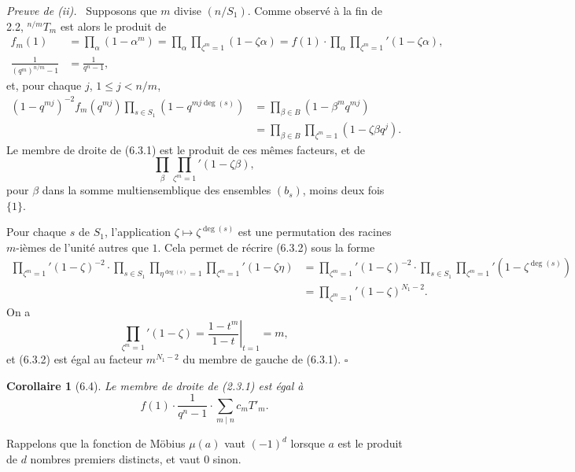 \documentclass[10pt]{article}
\newcommand{\degm}{\operatorname{deg}}
\theoremstyle{deligne}
\newtheorem*{corollary*}{Corollaire}
\newenvironment{proofdel}[1][Preuve.]{\textit{#1}\ }{\hfill$\square$}
\begin{document}
\begin{proofdel}[Preuve de (ii).]
Supposons que $m$ divise $(n/S_1)$. Comme observé à la fin de 2.2, ${}^{n/m}T_m$ est alors le produit de
\begin{align*}
f_m(1)&=\prod_\alpha(1-\alpha^m)=\prod_\alpha\prod_{\zeta^m=1}(1-\zeta\alpha)
      =f(1)\cdot\prod_\alpha\prod_{\zeta^m=1}'(1-\zeta\alpha),\\
\frac{1}{(q^m)^{n/m}-1}&=\frac{1}{q^n-1},
\end{align*}
et, pour chaque $j$, $1\le j<n/m$,
\begin{align*}
(1-q^{mj})^{-2}f_m(q^{mj})\prod_{s\in S_1}(1-q^{mj\degm(s)})
&=\prod_{\beta\in B}(1-\beta^m q^{mj})\\
&=\prod_{\beta\in B}\prod_{\zeta^m=1}(1-\zeta\beta q^j).
\end{align*}
Le membre de droite de (6.3.1) est le produit de ces mêmes facteurs, et de
\begin{equation}\tag{6.3.2}
\prod_\beta\prod_{\zeta^m=1}'(1-\zeta\beta),
\end{equation}
pour $\beta$ dans la somme multiensemblique des ensembles $(b_s)$, moins deux fois $\{1\}$.

Pour chaque $s$ de $S_1$, l'application $\zeta\mapsto\zeta^{\degm(s)}$ est une permutation des racines $m$-ièmes de l'unité autres que $1$. Cela permet de récrire (6.3.2) sous la forme
\begin{align*}
\prod_{\zeta^m=1}'(1-\zeta)^{-2}\cdot
\prod_{s\in S_1}\prod_{\eta^{\degm(s)}=1}\prod_{\zeta^m=1}'(1-\zeta\eta)
&=\prod_{\zeta^m=1}'(1-\zeta)^{-2}\cdot
\prod_{s\in S_1}\prod_{\zeta^m=1}'(1-\zeta^{\degm(s)})\\
&=\prod_{\zeta^m=1}'(1-\zeta)^{N_1-2}.
\end{align*}
On a
\[
\prod_{\zeta^m=1}'(1-\zeta)=\left.\frac{1-t^m}{1-t}\right|_{t=1}=m,
\]
et (6.3.2) est égal au facteur $m^{N_1-2}$ du membre de gauche de (6.3.1).
\end{proofdel}

\begin{corollary*}[6.4]
Le membre de droite de (2.3.1) est égal à
\begin{equation}\tag{6.4.1}
f(1)\cdot\frac{1}{q^n-1}\cdot\sum_{m\mid n}c_mT'_m.
\end{equation}
\end{corollary*}

Rappelons que la fonction de Möbius $\mu(a)$ vaut $(-1)^d$ lorsque $a$ est le produit de $d$ nombres premiers distincts, et vaut $0$ sinon.
\end{document}

